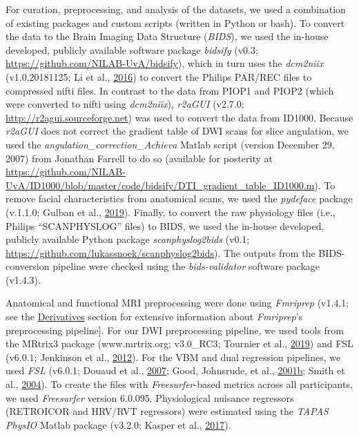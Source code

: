 \documentclass[12pt,american,a4paper,oneside,]{memoir} %
\begin{document}
For curation, preprocessing, and analysis of the datasets, we used a combination of existing packages and custom scripts (written in Python or bash). To convert the data to the Brain Imaging Data Structure (\emph{BIDS}), we used the in-house developed, publicly available software package \emph{bidsify} (v0.3; \url{https://github.com/NILAB-UvA/bidsify}), which in turn uses the \emph{dcm2niix} (v1.0.20181125; Li et al., \protect\hyperlink{ref-Li2016-ss}{2016}) to convert the Philips PAR/REC files to compressed nifti files. In contrast to the data from PIOP1 and PIOP2 (which were converted to nifti using \emph{dcm2niix}), \emph{r2aGUI} (v2.7.0; \url{http://r2agui.sourceforge.net}) was used to convert the data from ID1000. Because \emph{r2aGUI} does not correct the gradient table of DWI scans for slice angulation, we used the \emph{angulation\_correction\_Achieva} Matlab script (version December 29, 2007) from Jonathan Farrell to do so (available for posterity at \url{https://github.com/NILAB-UvA/ID1000/blob/master/code/bidsify/DTI_gradient_table_ID1000.m}). To remove facial characteristics from anatomical scans, we used the \emph{pydeface} package (v.1.1.0; Gulban et al., \protect\hyperlink{ref-Gulban2019-sv}{2019}). Finally, to convert the raw physiology files (i.e., Philips ``SCANPHYSLOG'' files) to BIDS, we used the in-house developed, publicly available Python package \emph{scanphyslog2bids} (v0.1; \url{https://github.com/lukassnoek/scanphyslog2bids}). The outputs from the BIDS-conversion pipeline were checked using the \emph{bids-validator} software package (v1.4.3).

Anatomical and functional MRI preprocessing were done using \emph{Fmriprep} (v1.4.1; see the \protect\hyperlink{aomic-derivatives}{Derivatives} section for extensive information about \emph{Fmriprep}'s preprocessing pipeline{]}. For our DWI preprocessing pipeline, we used tools from the MRtrix3 package (www.mrtrix.org; v3.0\_RC3; Tournier et al., \protect\hyperlink{ref-Tournier2019-hh}{2019}) and FSL (v6.0.1; Jenkinson et al., \protect\hyperlink{ref-Jenkinson2012-ui}{2012}). For the VBM and dual regression pipelines, we used \emph{FSL} (v6.0.1; Douaud et al., \protect\hyperlink{ref-Douaud2007-sw}{2007}; Good, Johnsrude, et al., \protect\hyperlink{ref-Good2001-kv}{2001}\protect\hyperlink{ref-Good2001-kv}{b}; Smith et al., \protect\hyperlink{ref-Smith2004-sc}{2004}). To create the files with \emph{Freesurfer}-based metrics across all participants, we used \emph{Freesurfer} version 6.0.095. Physiological nuisance regressors (RETROICOR and HRV/RVT regressors) were estimated using the \emph{TAPAS PhysIO} Matlab package (v3.2.0; Kasper et al., \protect\hyperlink{ref-Kasper2017-lp}{2017}).
\end{document}
